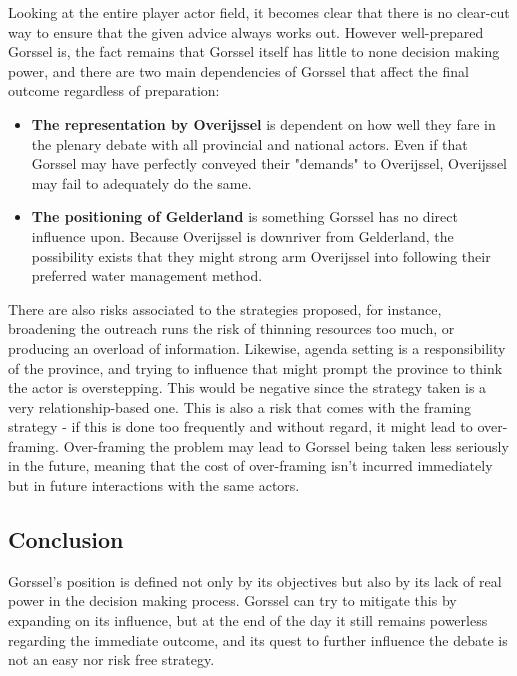 Looking at the entire player actor field, it becomes clear that there is no clear-cut way to ensure that the given advice always works out. However well-prepared Gorssel is, the fact remains that Gorssel itself has little to none decision making power, and there are two main dependencies of Gorssel that affect the final outcome regardless of preparation: 
\begin{itemize}
    \item \textbf{The representation by Overijssel} is dependent on how well they fare in the plenary debate with all provincial and national actors. Even if that Gorssel may have perfectly conveyed their "demands" to Overijssel, Overijssel may fail to adequately do the same. 
    \item \textbf{The positioning of Gelderland} is something Gorssel has no direct influence upon. Because Overijssel is downriver from Gelderland, the possibility exists that they might strong arm Overijssel into following their preferred water management method. 
\end{itemize}

There are also risks associated to the strategies proposed, for instance, broadening the outreach runs the risk of thinning resources too much, or producing an overload of information. Likewise, agenda setting is a responsibility of the province, and trying to influence that might prompt the province to think the actor is overstepping. This would be negative since the strategy taken is a very relationship-based one. This is also a risk that comes with the framing strategy - if this is done too frequently and without regard, it might lead to over-framing. Over-framing the problem may lead to Gorssel being taken less seriously in the future, meaning that the cost of over-framing isn't incurred immediately but in future interactions with the same actors.

\subsection{Conclusion}

Gorssel's position is defined not only by its objectives but also by its lack of real power in the decision making process. Gorssel can try to mitigate this by expanding on its influence, but at the end of the day it still remains powerless regarding the immediate outcome, and its quest to further influence the debate is not an easy nor risk free strategy.



